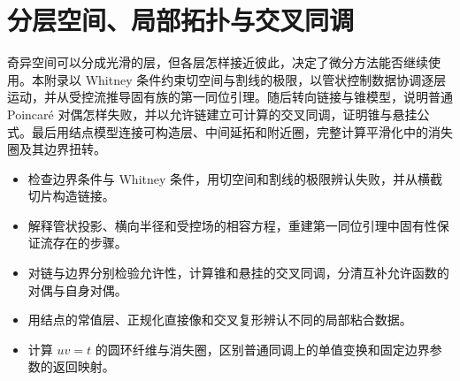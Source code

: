 
% 
% 
% 
% 
% 
% 
% 

\chapter{分层空间、局部拓扑与交叉同调}
\label{g2:app:B}

\begin{chapterabstract}
	奇异空间可以分成光滑的层，但各层怎样接近彼此，决定了微分方法能否继续使用。本附录以 Whitney 条件约束切空间与割线的极限，以管状控制数据协调逐层运动，并从受控流推导固有族的第一同位引理。随后转向链接与锥模型，说明普通 Poincaré 对偶怎样失败，并以允许链建立可计算的交叉同调，证明锥与悬挂公式。最后用结点模型连接可构造层、中间延拓和附近圈，完整计算平滑化中的消失圈及其边界扭转。
\end{chapterabstract}

\begin{learninggoals}
	\begin{itemize}
		\item 检查边界条件与 Whitney 条件，用切空间和割线的极限辨认失败，并从横截切片构造链接。
		\item 解释管状投影、横向半径和受控场的相容方程，重建第一同位引理中固有性保证流存在的步骤。
		\item 对链与边界分别检验允许性，计算锥和悬挂的交叉同调，分清互补允许函数的对偶与自身对偶。
		\item 用结点的常值层、正规化直接像和交叉复形辨认不同的局部粘合数据。
		\item 计算 \(uv=t\) 的圆环纤维与消失圈，区别普通同调上的单值变换和固定边界参数的返回映射。
	\end{itemize}
\end{learninggoals}

